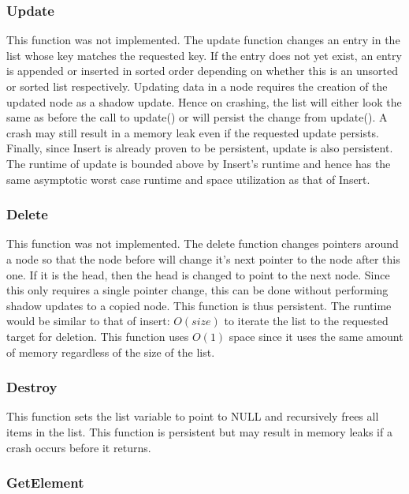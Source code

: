 \documentclass[twocolumn]{article}
\begin{document}
\subsubsection{Update}

This function was not implemented. The update function changes an entry in the
list whose key matches the requested key. If the entry does not yet exist, an
entry is appended or inserted in sorted order depending on whether this is an
unsorted or sorted list respectively. Updating data in a node requires the
creation of the updated node as a shadow update. Hence on crashing, the list
will either look the same as before the call to update() or will persist the
change from update(). A crash may still result in a memory leak even if the
requested update persists. Finally, since Insert is already proven to be
persistent, update is also persistent. The runtime of update is bounded above by
Insert's runtime and hence has the same asymptotic worst case runtime and space
utilization as that of Insert.

\subsubsection{Delete}

This function was not implemented. The delete function changes pointers around a
node so that the node before will change it's next pointer to the node after
this one. If it is the head, then the head is changed to point to the next node.
Since this only requires a single pointer change, this can be done without
performing shadow updates to a copied node. This function is thus persistent.
The runtime would be similar to that of insert: $O(size)$ to iterate the list to
the requested target for deletion. This function uses $O(1)$ space since it uses
the same amount of memory regardless of the size of the list.

\subsubsection{Destroy}

This function sets the list variable to point to NULL and recursively frees all
items in the list. This function is persistent but may result in memory leaks if
a crash occurs before it returns.

\subsubsection{GetElement}
\end{document}
